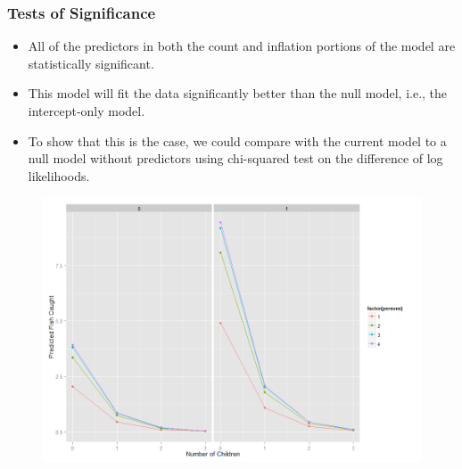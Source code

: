 \documentclass[MASTER.tex]{subfiles}
\begin{document}
\begin{frame}[fragile]
\frametitle{Tests of Significance}
\begin{itemize}
\item	All of the predictors in both the count and inflation portions of the model are statistically significant. 
\item This model will fit the data significantly better than the null model, i.e., the intercept-only model. 
\item To show that this is the case, we could compare with the current model to a null model without predictors using chi-squared test on the difference of log likelihoods. 
\end{itemize}	

\end{frame}
%	
%	
%	
\begin{frame}
	\begin{figure}
		\centering
		\includegraphics[width=0.7\linewidth]{zinbreg10}
		
	\end{figure}
	
	
\end{frame}
\end{document}
